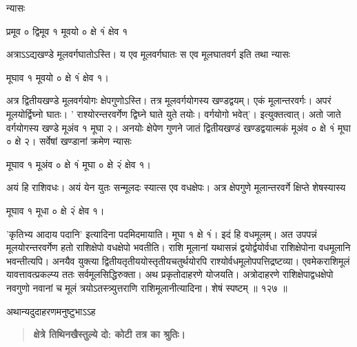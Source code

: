 \documentclass[11pt, openany]{book}
\begin{document}
\begin{sloppypar}
\hangindent=0.2in \hspace{0.2in}न्यासः
\begin{center}
प्रमूव ० द्विमूव १ मूवयो ० क्षे १ं क्षेव १
\end{center}

\hangindent=0.2in \hspace{0.2in}अत्राऽऽद्यखण्डे मूलवर्गघातोऽस्ति। य एव मूलवर्गघातः स एव मूलघातवर्ग इति तथा न्यासः

\begin{center}
मूघाव १ मूवयो ० क्षे १ं क्षेव १।
\end{center}

\hangindent=0.2in \hspace{0.2in}अत्र द्वितीयखण्डे मूलवर्गयोगः क्षेपगुणोऽस्ति। तत्र मूलवर्गयोगस्य खण्डद्वयम्। एकं मूलान्तरवर्गः। अपरं मूलयोर्द्विघ्नो घातः। ' राश्योरन्तरवर्गेण द्विघ्ने घाते युते तयोः। वर्गयोगो भवेत्'। इत्युक्तत्वात्। अतो जाते वर्गयोगस्य खण्डे मूअंव १ मूघा २। अनयोः क्षेपेण गुणने जातं द्वितीयखण्डं खण्डद्वयात्मकं मूअंव ० क्षे १ं मूघा ० क्षे २। सर्वेषां खण्डानां क्रमेण न्यासः

\begin{center}
मूघाव १ मूअंव ० क्षे १ं मूघा ० क्षे २ं क्षेव १।
\end{center}

\hangindent=0.2in \hspace{0.2in}अयं हि राशिवधः। अयं येन युतः सन्मूलदः स्यात्स एव वधक्षेपः। अत्र क्षेपगुणे मूलान्तरवर्गे क्षिप्ते शेषस्यास्य

\begin{center}
मूघाव १ मूधा ० क्षे २ं क्षेव १।
\end{center}

\hangindent=0.2in \hspace{0.2in}'कृतिभ्य आदाय पदानि' इत्यादिना पदमिदमायाति। मूघा १ क्षे १ं। इदं हि वधमूलम्। अत उपपन्नं मूलयोरन्तरवर्गेण हतो राशिक्षेपो वधक्षेपो भवतीति। राशि मूलानां यथासन्नं द्वयोर्द्वयोर्वधा राशिक्षेपोना वधमूलानि भवन्तीत्यपि। अनयैव युक्त्या द्वितीयतृतीययोस्तृतीयचतुर्थयोरपि राश्योर्वधमूलोपपत्तिद्रष्टव्या। एवमेकराशिमूलं यावत्तावत्प्रकल्प्य ततः सर्वमूलसिद्धिरुक्ता। अथ प्रकृतोदाहरणे योजयति। अत्रोदाहरणे राशिक्षेपाद्वधक्षेपो नवगुणो नवानां च मूलं त्रयोऽतस्त्र्युत्तराणि राशिमूलानीत्यादिना। शेषं स्पष्टम् ॥ १२७ ॥

\hangindent=0.2in \hspace{0.2in}अथान्यदुदाहरणमनुष्टुभाऽऽह \textendash

\begin{quote}
\hspace{1in}\textbf{क्षेत्रे तिथिनखैस्तुल्ये दो: कोटी तत्र का श्रुतिः।}


\end{quote}
\end{sloppypar}
\end{document}

